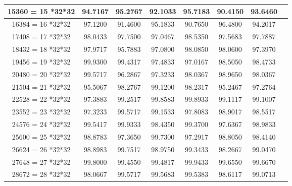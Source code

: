 \begin{table}[H]
\begin{center}
{\begin{tabular}{|c|c|c|c|c|c|c|c|}
				15360 = 15 *32*32&94.7167&95.2767&92.1033&95.7183&90.4150&93.6460
				
				\tabularnewline \hline 
				
				16384 = 16 *32*32&97.1200&91.4600&95.1833&90.7650&96.4800&94.2017
				
				\tabularnewline \hline 
				
				17408 = 17 *32*32&98.0433&97.7500&97.0467&98.5350&97.5683&97.7887
				
				\tabularnewline \hline 
				
				18432 = 18 *32*32&97.9717&95.7883&97.0800&98.0850&98.0600&97.3970
				
				\tabularnewline \hline 
				
				19456 = 19 *32*32&99.9300&99.4317&97.4833&97.0167&98.5050&98.4733
				
				\tabularnewline \hline 
				
				20480 = 20 *32*32&99.5717&96.2867&97.3233&98.0367&98.9650&98.0367
				
				\tabularnewline \hline 
				
				21504 = 21 *32*32&95.5067&98.2767&99.1200&98.2317&95.2467&97.2764
				
				\tabularnewline \hline 
				
				22528 = 22 *32*32&97.3883&99.2517&99.8583&99.8933&99.1117&99.1007
				
				\tabularnewline \hline 
				
				23552 = 23 *32*32&97.3233&99.5717&99.1533&97.8083&98.9017&98.5517
				
				\tabularnewline \hline 
				
				24576 = 24 *32*32&99.5417&99.9333&98.4350&99.3700&97.6367&98.9833
				
				\tabularnewline \hline 
				
				25600 = 25 *32*32&98.8783&97.3650&99.7300&97.2917&98.8050&98.4140
				
				\tabularnewline \hline 
				
				26624 = 26 *32*32&98.8983&99.7517&98.9750&99.3433&98.2667&99.0470
				
				\tabularnewline \hline 
				
				27648 = 27 *32*32&99.8000&99.4550&99.4817&99.9433&99.6550&99.6670
				
				\tabularnewline \hline 
				
				28672 = 28 *32*32&98.0667&99.5717&99.5683&99.5383&98.6117&99.0713
				
				\tabularnewline \hline 
				

\end{tabular}}
\end{center}
\end{table}
